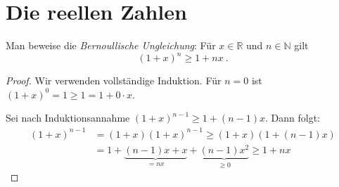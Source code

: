 \section{Die reellen Zahlen}
\setcounter{aufgabe}{5}
\begin{aufgabe}
	Man beweise die \textit{Bernoullische Ungleichung}: Für $x \in \mathbb R$
	und $n \in \mathbb N$ gilt
	\[
		(1 + x)^n \geq 1 + nx \ .
	\]
\end{aufgabe}
\begin{proof}
	Wir verwenden vollständige Induktion. Für $n = 0$ ist
	$(1 + x)^0 = 1 \geq 1 = 1 + 0 \cdot x$.

	Sei nach Induktionsannahme $(1 + x)^{n-1} \geq 1 + (n-1) x$.
	Dann folgt:
	\begin{align*}
		(1 + x)^{n-1}
			&= (1 + x) (1 + x)^{n-1}
			\geq (1 + x) \left( 1 + (n-1)x \right) \\
			&= 1 + \underbrace{ (n-1) x + x}_{=nx} + \underbrace{ (n-1) x^2}_{ \geq 0}
			\geq 1 + nx
	\end{align*}
\end{proof}


